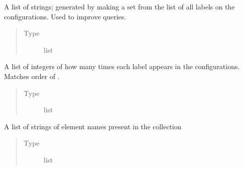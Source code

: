 \documentclass[letterpaper,10pt,english]{sphinxmanual}
\begin{document}
\begin{fulllineitems}
\begin{fulllineitems}
\label{\detokenize{configuration_set:colabfit.tools.configuration_sets.ConfigurationSet.labels}}
\sphinxAtStartPar
A list of strings; generated by making a set from the list of all
labels on the configurations. Used to improve queries.
\begin{quote}\begin{description}
\item[{Type}] \leavevmode
\sphinxAtStartPar
list

\end{description}\end{quote}

\end{fulllineitems}


\begin{fulllineitems}
\label{\detokenize{configuration_set:colabfit.tools.configuration_sets.ConfigurationSet.labels_counts}}
\sphinxAtStartPar
A list of integers of how many times each label appears in the
configurations. Matches order of .
\begin{quote}\begin{description}
\item[{Type}] \leavevmode
\sphinxAtStartPar
list

\end{description}\end{quote}

\end{fulllineitems}


\begin{fulllineitems}
\label{\detokenize{configuration_set:colabfit.tools.configuration_sets.ConfigurationSet.elements}}
\sphinxAtStartPar
A list of strings of element names present in the collection
\begin{quote}\begin{description}
\item[{Type}] \leavevmode
\sphinxAtStartPar
list


\end{description}
\end{quote}
\end{fulllineitems}
\end{fulllineitems}
\end{document}
